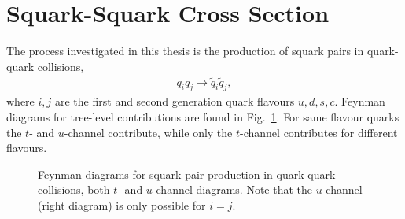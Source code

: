 \documentclass[twoside,english]{uiofysmaster}
\begin{document}
{\section{Squark-Squark Cross Section}
The process investigated in this thesis is the production of squark pairs in quark-quark collisions,
\begin{align}
q_i q_j \rightarrow \widetilde{q}_i \widetilde{q}_j,
\end{align}
where $i,j$ are the first and second generation quark flavours $u, d, s, c$. Feynman diagrams for tree-level contributions are found in Fig.\ \ref{Fig:: susy hadron : Feynman qq}. For same flavour quarks the $t$- and $u$-channel contribute, while only the $t$-channel contributes for different flavours. 

\begin{figure}
\centering
{}
\caption[Tree-level Feynman diagrams for $q_iq_J \rightarrow \widetilde{q}_i \widetilde{q}_j$]{Feynman diagrams for squark pair production in quark-quark collisions, both $t$- and $u$-channel diagrams. Note that the $u$-channel (right diagram) is only possible for $i=j$.}
\label{Fig:: susy hadron : Feynman qq}
\end{figure}



}
\end{document}
